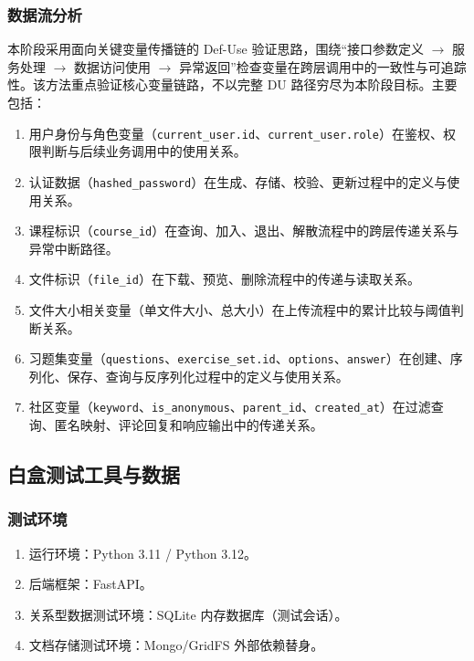 \documentclass[12pt,a4paper]{ctexart}
\begin{document}
\subsubsection{数据流分析}

本阶段采用面向关键变量传播链的 Def-Use 验证思路，围绕“接口参数定义 $\rightarrow$ 服务处理 $\rightarrow$ 数据访问使用 $\rightarrow$ 异常返回”检查变量在跨层调用中的一致性与可追踪性。该方法重点验证核心变量链路，不以完整 DU 路径穷尽为本阶段目标。主要包括：

\begin{enumerate}
  \item 用户身份与角色变量（\texttt{current\_user.id}、\texttt{current\_user.role}）在鉴权、权限判断与后续业务调用中的使用关系。
  \item 认证数据（\texttt{hashed\_password}）在生成、存储、校验、更新过程中的定义与使用关系。
  \item 课程标识（\texttt{course\_id}）在查询、加入、退出、解散流程中的跨层传递关系与异常中断路径。
  \item 文件标识（\texttt{file\_id}）在下载、预览、删除流程中的传递与读取关系。
  \item 文件大小相关变量（单文件大小、总大小）在上传流程中的累计比较与阈值判断关系。
  \item 习题集变量（\texttt{questions}、\texttt{exercise\_set.id}、\texttt{options}、\texttt{answer}）在创建、序列化、保存、查询与反序列化过程中的定义与使用关系。
  \item 社区变量（\texttt{keyword}、\texttt{is\_anonymous}、\texttt{parent\_id}、\texttt{created\_at}）在过滤查询、匿名映射、评论回复和响应输出中的传递关系。
\end{enumerate}

\subsection{白盒测试工具与数据}

\subsubsection{测试环境}

\begin{enumerate}
  \item 运行环境：Python 3.11 / Python 3.12。
  \item 后端框架：FastAPI。
  \item 关系型数据测试环境：SQLite 内存数据库（测试会话）。
  \item 文档存储测试环境：Mongo/GridFS 外部依赖替身。
\end{enumerate}
\end{document}
